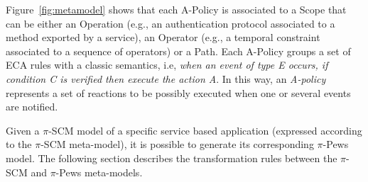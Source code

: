Figure~\ref{fig:metamodel} shows that each {\sc A-Policy} is associated to a {\sc Scope} that can be either an {\sc Operation} (e.g., an authentication protocol associated to a method exported by a service),  an {\sc Operator} (e.g., a temporal constraint associated to a sequence of operators) or a {\sc Path}.  
Each {\sc A-Policy} groups a set of ECA rules with a classic semantics, i.e, {\em when an event of type E occurs, if condition C is verified then execute the action A}.  
In this way, an {\em A-policy} represents a set of reactions to be possibly executed when one or several events are notified.
%

Given a $\pi$-SCM model of a specific service based application (expressed according to the $\pi$-SCM meta-model), it is possible to generate its corresponding $\pi$-{\sc Pews} model. 
The following section describes the transformation rules between the $\pi$-SCM and $\pi$-{\sc Pews} meta-models.



